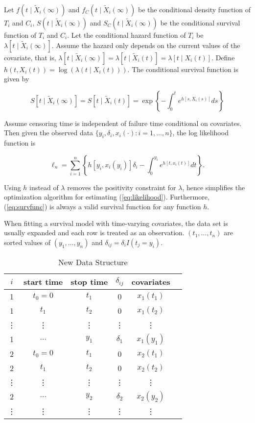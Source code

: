 \documentclass[12pt]{article}
\begin{document}
Let $f(t \mid \tilde{X}_i(\infty))$ and $f_{C}(t \mid
\tilde{X}_i(\infty))$ be the conditional density function of $T_i$ and
$C_i$, $S(t \mid \tilde{X}_i(\infty))$ and $S_{C}(t \mid
\tilde{X}_i(\infty))$ be the conditional survival function of $T_i$
and $C_i$.  Let the conditional hazard function of $T_i$ be $\lambda
\left[t \mid \tilde{X}_i(\infty)\right]$. Assume the hazard only
depends on the current values of the covariate, that is, $\lambda
\left[t \mid \tilde{X}_i(\infty)\right] = \lambda \left[t \mid
\tilde{X}_i(t)\right] = \lambda \left[t \mid X_i(t)\right]$. Define
$h(t,X_i(t))=\log (\lambda (t \mid X_i(t)))$. The conditional survival
function is given by

\begin{equation} S\left[t \mid \widetilde{X}_i(\infty)\right]=S\left[t
\mid \widetilde{X}_i(t)\right]=\exp \left\{-\int_0^t e^{h\left[s,
X_i(s)\right]} d s\right\}
\label{eq:survfunc}
\end{equation}

Assume censoring time is independent of failure time conditional on
covariates. Then given the observed data $\{y_i, \delta_i, x_i(\cdot):
i=1, \ldots, n\}$, the log likelihood function is

\begin{equation} \ell_n=\sum_{i=1}^n\left\{h\left[y_i,
x_i\left(y_i\right)\right] \delta_i - \int_0^{y_i} e^{h\left[t,
x_i(t)\right]} d t\right\}.
\label{eq:likelihood}
\end{equation}

Using $h$ instead of $\lambda$ removes the positivity constraint for
$\lambda$, hence simpliﬁes the optimization algorithm for estimating
(\ref{eq:likelihood}). Furthermore, (\ref{eq:survfunc}) is always a
valid survival function for any function $h$.

When ﬁtting a survival model with time-varying covariates, the data
set is usually expanded and each row is treated as an
observation. $(t_1, \ldots, t_n)$ are sorted values of $(y_1, \ldots,
y_n)$ and $\delta_{ij} = \delta_{i} I(t_j = y_i)$.

\begin{table}[h]
\centering
\begin{tabular}{cccccc}
\hline
$i$ & start time & stop time & $\delta_{ij}$ & covariates \\ 
\hline
1 & $t_0 = 0$ & $t_1$ & 0 & $x_1(t_1)$ \\
1 & $t_1$ & $t_2$ & 0 & $x_1(t_2)$ \\
\vdots & \vdots & \vdots & \vdots & \vdots \\
1 & $\dots$ & $y_1$ & $\delta_1$ & $x_1(y_1)$ \\
2 & $t_0 = 0$ & $t_1$ & 0 & $x_2(t_1)$ \\
2 & $t_1$ & $t_2$ & 0 & $x_2(t_2)$ \\
\vdots & \vdots & \vdots & \vdots & \vdots \\
2 & $\dots$ & $y_2$ & $\delta_2$ & $x_2(y_2)$ \\
\vdots & \vdots & \vdots & \vdots & \vdots \\
\hline
\end{tabular}
\caption{New Data Structure}
\label{tab:label1}
\end{table}
\end{document}
